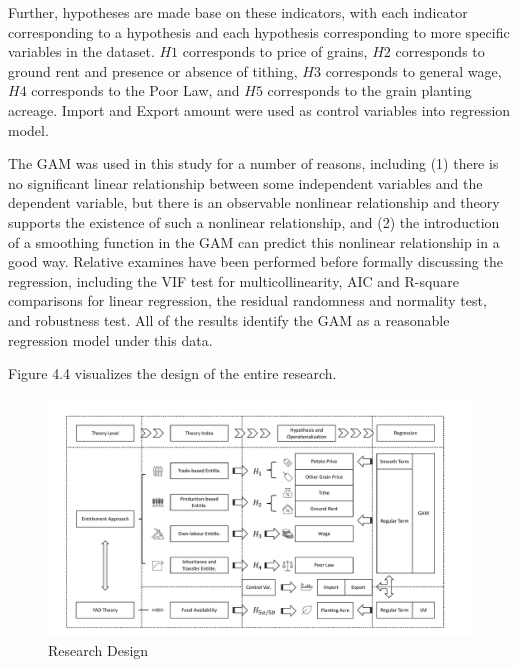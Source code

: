 Further, hypotheses are made base on these indicators, with each indicator corresponding to a hypothesis and each hypothesis corresponding to more specific variables in the dataset. $H1$ corresponds to price of grains, $H2$ corresponds to ground rent and presence or absence of tithing, $H3$ corresponds to general wage, $H4$ corresponds to the Poor Law, and $H5$ corresponds to the grain planting acreage. Import and Export amount were used as control variables into regression model.

The GAM was used in this study for a number of reasons, including (1) there is no significant linear relationship between some independent variables and the dependent variable, but there is an observable nonlinear relationship and theory supports the existence of such a nonlinear relationship, and (2) the introduction of a smoothing function in the GAM can predict this nonlinear relationship in a good way. Relative examines have been performed before formally discussing the regression, including the VIF test for multicollinearity, AIC and R-square comparisons for linear regression, the residual randomness and normality test, and robustness test. All of the results identify the GAM as a reasonable regression model under this data.

Figure 4.4 visualizes the design of the entire research.

\begin{landscape}
    \begin{figure}[h]
        \centering
        \caption{Research Design}
        \includegraphics[width=1.5\textheight]{../03_outputs/Framework.pdf}
    \end{figure}
\end{landscape}
